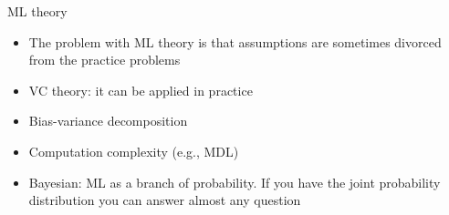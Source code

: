 \documentclass[aspectratio=169, xcolor=dvipsnames]{beamer}
\begin{document}

  \begin{frame}{ML theory}
    \begin{itemize}
      \item The problem with ML theory is that assumptions are sometimes divorced
        from the practice problems

      \item VC theory: it can be applied in practice

      \item Bias-variance decomposition

      \item Computation complexity (e.g., MDL)

      \item Bayesian: ML as a branch of probability. If you have the joint probability
        distribution you can answer almost any question
    \end{itemize}
  \end{frame}
\end{document}
